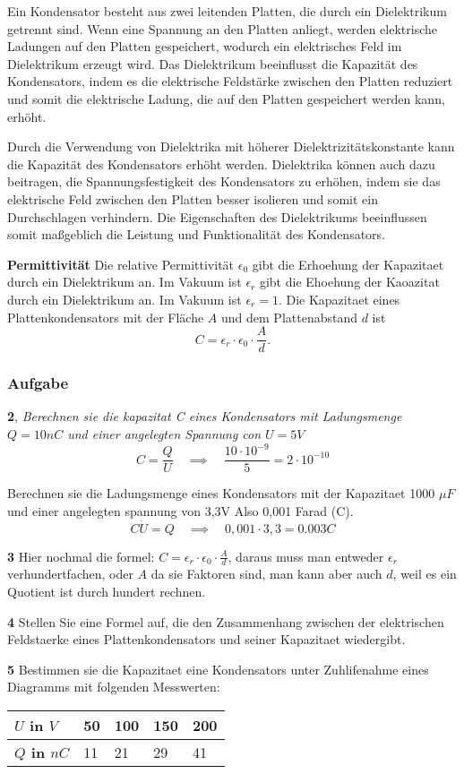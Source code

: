 \documentclass[a4paper]{report}
\begin{document}
Ein Kondensator besteht aus zwei leitenden Platten, die durch ein Dielektrikum
getrennt sind. Wenn eine Spannung an den Platten anliegt, werden elektrische
Ladungen auf den Platten gespeichert, wodurch ein elektrisches Feld im
Dielektrikum erzeugt wird. Das Dielektrikum beeinflusst die Kapazität des
Kondensators, indem es die elektrische Feldstärke zwischen den Platten
reduziert und somit die elektrische Ladung, die auf den Platten gespeichert
werden kann, erhöht.

Durch die Verwendung von Dielektrika mit höherer Dielektrizitätskonstante kann
die Kapazität des Kondensators erhöht werden. Dielektrika können auch dazu
beitragen, die Spannungsfestigkeit des Kondensators zu erhöhen, indem sie das
elektrische Feld zwischen den Platten besser isolieren und somit ein
Durchschlagen verhindern. Die Eigenschaften des Dielektrikums beeinflussen
somit maßgeblich die Leistung und Funktionalität des Kondensators.


\textbf{Permittivit\"at}
Die relative Permittivit\"at $\epsilon_0$ gibt die Erhoehung der Kapazitaet
durch ein Dielektrikum an. Im Vakuum ist $\epsilon_r$ gibt die Ehoehung der
Kaoazitat durch ein Dielektrikum an. Im Vakuum ist $\epsilon_r = 1$. Die
Kapazitaet eines Plattenkondensators mit der Fl\"ache $A$ und dem
Plattenabstand $d$ ist
\[C=\epsilon_r \cdot \epsilon_0 \cdot \frac{A}{d}.\]

\subsubsection{Aufgabe}
\textbf{2}, \textit{Berechnen sie die kapazitat C eines Kondensators mit Ladungsmenge
$Q=10nC$ und einer angelegten Spannung con $U=5V$}
\[ C=\frac{Q}{U} \quad \implies \quad \frac{10 \cdot 10^{-9}}{5}= 2\cdot 10^{-10} \]

Berechnen sie die Ladungsmenge eines Kondensators mit der Kapazitaet 1000 $\mu
F$ und einer angelegten spannung von 3,3V Also 0,001 Farad (C).
\[
  C \dot U = Q \quad \implies \quad 0,001\cdot 3,3= 0.003 C
\]

\textbf{3}
Hier nochmal die formel: $C=\epsilon_r \cdot \epsilon_0 \cdot \frac{A}{d}$,
daraus muss man entweder $\epsilon_r$ verhundertfachen, oder $A$ da sie
Faktoren sind, man kann aber auch $d$, weil es ein Quotient ist durch hundert
rechnen.

\textbf{4}
Stellen Sie eine Formel auf, die den Zusammenhang zwischen der elektrischen
Feldstaerke eines Plattenkondensators und seiner Kapazitaet wiedergibt.

\textbf{5}
Bestimmen sie die Kapazitaet eine Kondensators unter Zuhlifenahme eines
Diagramms mit folgenden Messwerten:

\begin{table}[htpb]
  \begin{center}
    \begin{tabular}{|l|l|l|l|l|}
      \hline
      \textbf{$U$ in $V$} & 50 & 100 & 150 & 200 \\
      \hline
      \textbf{$Q$ in $nC$}& 11 &  21 &  29 &  41 \\
      \hline
    \end{tabular}
  \end{center}
\end{table}
\end{document}
